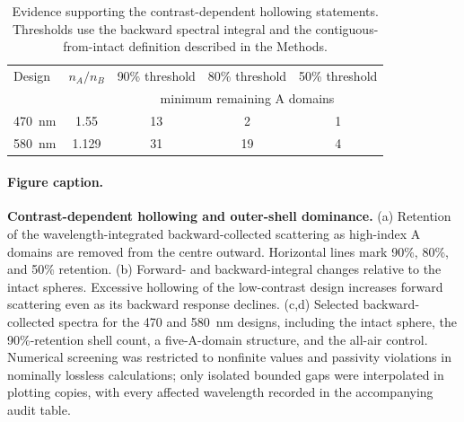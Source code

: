 \begin{table}[t]
\centering
\caption{Evidence supporting the contrast-dependent hollowing statements. Thresholds use the backward spectral integral and the contiguous-from-intact definition described in the Methods.}
\label{tab:hollowing_thresholds}
\begin{tabular}{lcccc}
\hline
Design & $n_A/n_B$ & 90\% threshold & 80\% threshold & 50\% threshold\\
 & & \multicolumn{3}{c}{minimum remaining A domains}\\
\hline
470~nm & 1.55  & 13 & 2  & 1\\
580~nm & 1.129 & 31 & 19 & 4\\
\hline
\end{tabular}
\end{table}

\paragraph{Figure caption.}
\textbf{Contrast-dependent hollowing and outer-shell dominance.}
(a) Retention of the wavelength-integrated backward-collected scattering as high-index A domains are removed from the centre outward. Horizontal lines mark 90\%, 80\%, and 50\% retention. (b) Forward- and backward-integral changes relative to the intact spheres. Excessive hollowing of the low-contrast design increases forward scattering even as its backward response declines. (c,d) Selected backward-collected spectra for the 470 and 580~nm designs, including the intact sphere, the 90\%-retention shell count, a five-A-domain structure, and the all-air control. Numerical screening was restricted to nonfinite values and passivity violations in nominally lossless calculations; only isolated bounded gaps were interpolated in plotting copies, with every affected wavelength recorded in the accompanying audit table.
